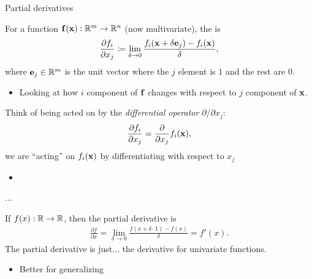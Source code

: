 \documentclass[8pt, aspectratio=149]{beamer}
\begin{document}
\begin{frame}{Partial derivatives}

    For a function \( \mVector{f}(\mVector{x}) : \R^m \to \R^n \) (now multivariate), 
    the  is  
    \begin{align*}
        \frac{\partial f_i}{\partial x_j} 
        \coloneqq 
        \lim_{\delta \to 0} \frac{f_i(\mVector{x} + \delta \mVector{e}_j) - f_i(\mVector{x})}{\delta},
    \end{align*} 
    where \( \mVector{e}_j \in \R^m \) is the unit vector where the \( j \)\thel{} element is \( 1 \) and the rest are \( 0 \). 
    \begin{itemize}
        \item Looking at how \( i \)\thel{} component of \( \mVector{f} \) changes with respect to \( j \)\thel{} component of \( \mVector{x} \).     
    \end{itemize}  
    
    \vspace{1em} 
    Think of being acted on by the \textit{differential operator} \( \partial / \partial x_j \): 
    \begin{align*}
        \frac{\partial f_i}{\partial x_j} = \frac{\partial}{\partial x_j} f_i(\mVector{x}),
    \end{align*} 
    we are ``acting'' on \( f_i(\mVector{x}) \) by differentiating with respect to \( x_j \) 
    \begin{itemize}
        \item {} 
    \end{itemize}

\end{frame}



\begin{frame}{...}

    If \( f(x) : \mathbb{R} \to \mathbb{R} \), then the partial derivative is 
    \begin{align*}
        \frac{\partial f}{\partial x} 
        = \lim_{\delta \to 0} \frac{f(x + \delta \cdot 1) - f(x)}{\delta} 
        = f'(x).  
    \end{align*} 
    The partial derivative is just... the derivative for univariate functions. 

    \vspace{1em} 
    \begin{itemize}
        \item Better for generalizing 
    \end{itemize}

\end{frame}
\end{document}
